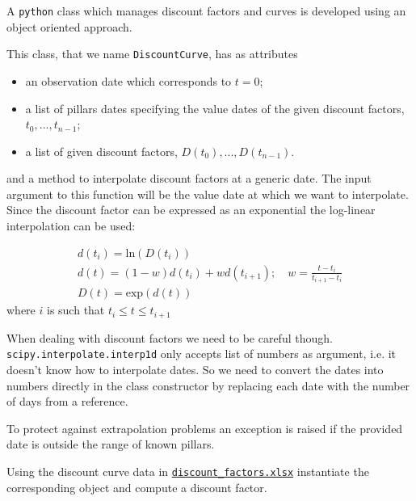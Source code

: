 \begin{finmarkets}
A \texttt{python} class which manages discount factors and curves is developed using an object oriented approach.

This class, that we name \texttt{DiscountCurve}, has as attributes
\begin{itemize}
	\tightlist
    \item an observation date which corresponds to $t=0$;
	\item a list of pillars dates specifying the value dates of the given discount factors, $t_0,...,t_{n-1}$;
	\item a list of given discount factors, $D(t_0),...,D(t_{n-1})$.
\end{itemize}

and a method to interpolate discount factors at a generic date. The input argument to this function will be the value date at which we want to interpolate. Since the discount factor can be expressed as an exponential the log-linear interpolation can be used:

\begin{equation}
	\begin{gathered}
		d(t_i)=\mathrm{ln}(D(t_i))\\
		d(t) = (1-w)d(t_i) + wd(t_{i+1});\quad w=\frac{t-t_i}{t_{i+1}-t_i}\\
		D(t) = \mathrm{exp}(d(t))
	\end{gathered}
\end{equation}
where $i$ is such that $t_i \le t \le t_{i+1}$

When dealing with discount factors we need to be careful though. \texttt{scipy.interpolate.interp1d} only accepts list of numbers as argument, i.e. it doesn't know how to interpolate dates. So we need to convert the dates into numbers directly in the class constructor by replacing each date with the number of days from a reference.

To protect against extrapolation problems an exception is raised if the provided date is outside the range of known pillars.
\end{finmarkets}


Using the discount curve data in \href{https://github.com/matteosan1/finance_course/raw/master/input_files/discount_factors_2022-10-05.xlsx}{\texttt{discount\_factors.xlsx}} instantiate the corresponding object and compute a discount factor.


